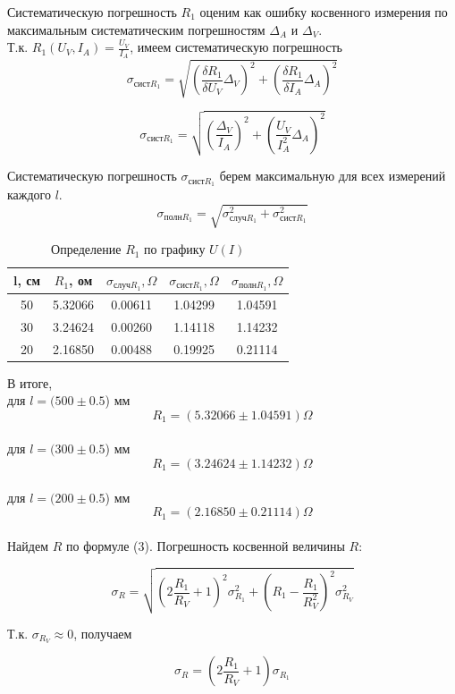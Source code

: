 \documentclass{article}
\begin{document}
	Систематическую погрешность $R_{1}$ оценим как ошибку косвенного измерения по максимальным систематическим погрешностям $\Delta_{A}$ и $\Delta_{V}$.\\  
	Т.к. $R_{1}(U_{V}, I_{A}) = \frac{U_{V}}{I_{A}}$, имеем систематическую погрешность
	\[\sigma_{\text{сист}R_{1}} = \sqrt{ (\frac{\delta R_{1}}{\delta U_{V}}\Delta_{V})^{2} + (\frac{\delta R_{1}}{\delta I_{A}}\Delta_{A})^{2} }\]
	
	\[\sigma_{\text{сист}R_{1}} = \sqrt{ (\frac{\Delta_{V}}{I_{A}})^{2} + (\frac{U_{V}}{I_{A}^{2}}\Delta_{A})^{2} }\]
	
	Систематическую погрешность $\sigma_{\text{сист}R_{1}}$ берем максимальную для всех измерений каждого $l$.
	$$\sigma_{\text{полн}R_{1}} = \sqrt{\sigma_{\text{случ}R_{1}}^{2} + \sigma_{\text{сист}R_{1}}^{2}}$$
	
	
	\begin{table}[H]
		\centering
		\begin{tabular}{|c|c|c|c|c|}
			\hline
			l, см & $R_{1}$, ом & $\sigma_{\text{случ}R_{1}}, \Omega$ & $\sigma_{\text{сист}R_{1}}, \Omega$ & $\sigma_{\text{полн}R_{1}}, \Omega$ \\ \hline
			50 & 5.32066 & 0.00611 & 1.04299 & 1.04591 \\ \hline
			30 & 3.24624 & 0.00260 & 1.14118 & 1.14232 \\ \hline
			20 & 2.16850 & 0.00488 & 0.19925 & 0.21114 \\ \hline
		\end{tabular}
		\caption{Определение $R_{1}$ по графику $U(I)$}
	\end{table}
	
	В итоге,\\
	для $l = (500 \pm 0.5$) мм 
	$$R_{1} = (5.32066 \pm 1.04591) \Omega$$\\
	для $l = (300 \pm 0.5$) мм 
	$$R_{1} = (3.24624 \pm 1.14232) \Omega$$ \\
	для $l = (200 \pm 0.5$) мм 
	$$R_{1} = (2.16850 \pm 0.21114) \Omega$$ \\
	
	Найдем $R$ по формуле (3). 
	Погрешность косвенной величины $R$:
	
	$$\sigma_{R} = \sqrt{(2\frac{R_{1}}{R_{V}} + 1)^{2} \sigma_{R_{1}}^{2} + (R_{1} - \frac{R_{1}}{R_{V}^{2}})^{2} \sigma_{R_{V}}^{2}}$$
	
	Т.к. $\sigma_{R_{V}} \approx 0$, получаем
	
	$$\sigma_{R} = (2\frac{R_{1}}{R_{V}} + 1) \sigma_{R_{1}}$$
	
\end{document}
